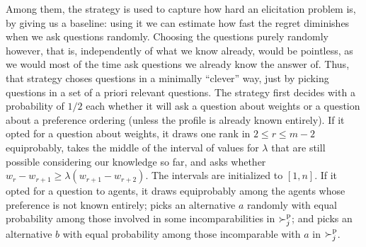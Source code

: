 Among them, the  strategy is used to capture how hard an elicitation problem is, by giving us a baseline: using it we can estimate how fast the regret diminishes when we ask questions randomly. 
Choosing the questions purely randomly however, that is, independently of what we know already, would be pointless, as we would most of the time ask questions we already know the answer of. Thus, that strategy choses questions in a minimally “clever” way, just by picking questions in a set of a priori relevant questions. 
The  strategy first decides with a probability of $1/2$ each whether it will ask a question about weights or a question about a preference ordering (unless the profile is already known entirely). If it opted for a question about weights, it draws one rank in $2 ≤ r ≤ m-2$ equiprobably, takes the middle of the interval of values for $\lambda$ that are still possible considering our knowledge so far, and asks whether $w_r - w_{r+1} ≥ \lambda (w_{r+1} - w_{r+2})$. The intervals are initialized to $[1, n]$. If it opted for a question to agents, it draws equiprobably among the agents whose preference is not known entirely; picks an alternative $a$ randomly with equal probability among those involved in some incomparabilities in $\succ^\text{p}_j$; and picks an alternative $b$ with equal probability among those incomparable with $a$ in $\succ^\text{p}_j$.


